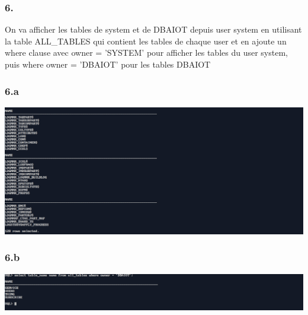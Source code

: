 \subsubsection*{6.}
On va afficher les tables de system et de DBAIOT depuis user system
en utilisant la table ALL\_TABLES qui contient les tables de chaque user 
et en ajoute un where clause avec owner = 'SYSTEM' pour afficher les tables du user system,
puis where owner = 'DBAIOT' pour les tables DBAIOT
\subsubsection*{6.a}



\begin{center}
    \includegraphics[width=\textwidth]{ScreenShot/Partie5/q6.a.png}
\end{center}


\subsubsection*{6.b}



\begin{center}
    \includegraphics[width=\textwidth]{ScreenShot/Partie5/q6.b.png}
\end{center}

